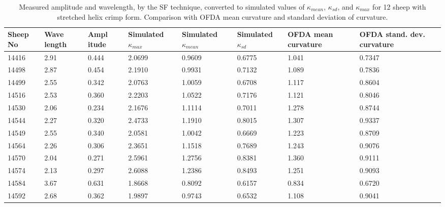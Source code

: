 %

\begin{table}[htp]
\centering
\caption{Measured amplitude and wavelength, by the SF technique, converted to simulated values of $\kappa_{mean}$, $\kappa_{sd}$, and $\kappa_{max}$ for 12 sheep with stretched helix crimp form. Comparison with OFDA mean curvature and standard deviation of curvature.}
\label{tab:ofdasimsf}
\vspace{0.1in}
\begin{tabular}{|p{0.4in}|p{0.4in}|p{0.4in}|p{0.6in}|p{0.6in}|p{0.5in}|p{0.5in}|p{0.6in}|} \hline
  Sheep No &   Wave length  & Ampl itude & Simulated $\kappa_{max}$  & Simulated $\kappa_{mean}$ & Simulated $\kappa_{sd}$ & OFDA mean curvature & OFDA stand. dev. curvature  \\  \hline
  14416 & 2.91  & 0.444  & 2.0699 & 0.9609 & 0.6775 & 1.041 & 0.7347  \\ 
  14498 & 2.87  & 0.454  & 2.1910 & 0.9931 & 0.7132 & 1.089 & 0.7836  \\
  14499 & 2.55  & 0.342  & 2.0763 & 1.0059 & 0.6708 & 1.117 & 0.8604  \\
  14516 & 2.53  & 0.360  & 2.2203 & 1.0522 & 0.7176 & 1.121 & 0.8046  \\ 
  14530 & 2.06  & 0.234  & 2.1676 & 1.1114 & 0.7011 & 1.278 & 0.8744  \\
  14544 & 2.27  & 0.320  & 2.4733 & 1.1910 & 0.8015 & 1.307 & 0.9337  \\
  14549 & 2.55  & 0.340  & 2.0581 & 1.0042 & 0.6669 & 1.223 & 0.8709  \\ 
  14564 & 2.26  & 0.306  & 2.3651 & 1.1518 & 0.7689 & 1.243 & 0.9076  \\
  14570 & 2.04  & 0.271  & 2.5961 & 1.2756 & 0.8381 & 1.360 & 0.9111  \\
  14574 & 2.13  & 0.297  & 2.6088 & 1.2386 & 0.8493 & 1.251 & 0.9093  \\ 
  14584 & 3.67  & 0.631  & 1.8668 & 0.8092 & 0.6157 & 0.834 & 0.6720  \\
  14592 & 2.68  & 0.362  & 1.9897 & 0.9743 & 0.6532 & 1.108 & 0.9041  \\ \hline
\end{tabular}
\end{table}

%

